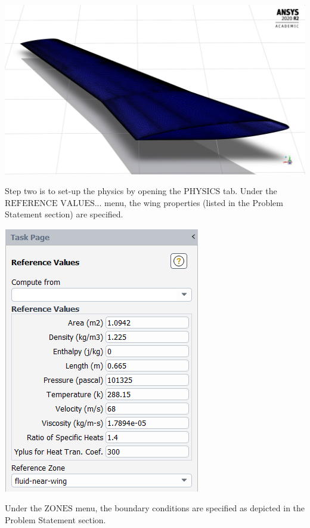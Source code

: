 \documentclass{article}
\begin{document}
\begin{center}
  \includegraphics[scale=0.20]{./img/mesh.png}
\end{center}

Step two is to set-up the physics by opening the $\textrm{PHYSICS}$ tab. Under the $\textrm{REFERENCE VALUES...}$ menu, the wing properties (listed in the Problem Statement section) are specified.

\begin{center}
  \includegraphics[scale=0.60]{./img/referenceValues.png}
\end{center}

Under the $\textrm{ZONES}$ menu, the boundary conditions are specified as depicted in the Problem Statement section. 
\end{document}

